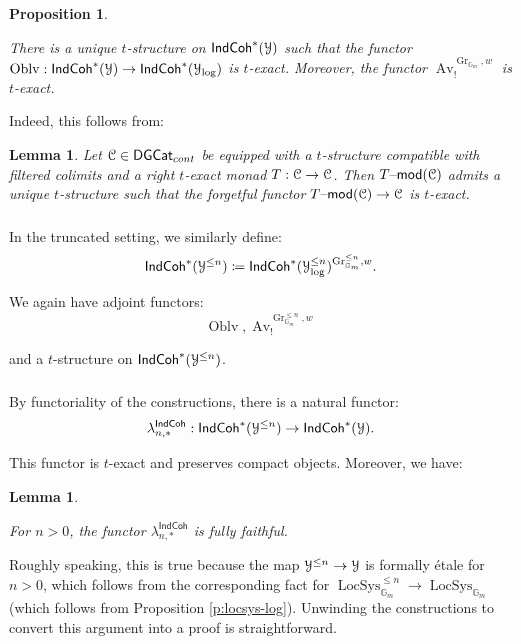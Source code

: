 \documentclass[reqno,11pt]{amsart}
\numberwithin{equation}{subsection}
\newtheorem{lem}[thm]{Lemma}
\newtheorem{prop}[thm]{Proposition}
\theoremstyle{remark}
\newcommand{\bG}{{\mathbb G}}
\newcommand{\sC}{{\EuScript C}}
\newcommand{\sY}{{\EuScript Y}}
\newcommand{\on}{\operatorname}
\newcommand{\mathendash}{\text{\textendash}}
\newcommand{\Gr}{\on{Gr}}
\newcommand{\LocSys}{\on{LocSys}}
\renewcommand{\mod}{\mathendash\mathsf{mod}}
\newcommand{\DGCat}{\mathsf{DGCat}}
\newcommand{\Oblv}{\on{Oblv}}
\newcommand{\Av}{\on{Av}}
\newcommand{\IndCoh}{\mathsf{IndCoh}}
\begin{document}
\begin{prop}\label{p:y-t-str}

There is a unique $t$-structure on $\IndCoh^*(\sY)$ such that the
functor $\Oblv:\IndCoh^*(\sY) \to \IndCoh^*(\sY_{\log})$ is $t$-exact.
Moreover, the functor $\Av_!^{\Gr_{\bG_m},w}$ is $t$-exact.

\end{prop}

Indeed, this follows from:

\begin{lem}

Let $\sC \in \DGCat_{cont}$ be equipped with a $t$-structure compatible with
filtered colimits and a right $t$-exact monad $T:\sC \to \sC$.
Then $T\mod(\sC)$ admits a unique $t$-structure such that the
forgetful functor $T\mod(\sC) \to \sC$ is $t$-exact. 

\end{lem}

\subsubsection{}\label{ss:y-trun-indcoh}

In the truncated setting, we similarly define:
%
\[
\IndCoh^*(\sY^{\leq n}) \coloneqq 
\IndCoh^*(\sY_{\log}^{\leq n})^{\Gr_{\bG_m}^{\leq n},w}.
\]

\noindent We again have adjoint functors:
%
\[
\Oblv,\Av_!^{\Gr_{\bG_m}^{\leq n},w}
\]

\noindent and a $t$-structure on $\IndCoh^*(\sY^{\leq n})$.

\subsubsection{}

By functoriality of the constructions, there is a natural functor:
%
\[
\lambda_{n,*}^{\IndCoh}:\IndCoh^*(\sY^{\leq n}) \to \IndCoh^*(\sY).
\]

\noindent This functor is $t$-exact and preserves compact objects. Moreover, we have:

\begin{lem}\label{l:lambda-ff}

For $n>0$, the functor $\lambda_{n,*}^{\IndCoh}$ is fully faithful.

\end{lem}

Roughly speaking, this is true because the map $\sY^{\leq n} \to \sY$ is 
formally \'etale for $n>0$, which follows from the corresponding
fact for $\LocSys_{\bG_m}^{\leq n} \to \LocSys_{\bG_m}$ (which 
follows from Proposition \ref{p:locsys-log}). Unwinding the constructions
to convert this argument into a proof is straightforward. 
\end{document}
